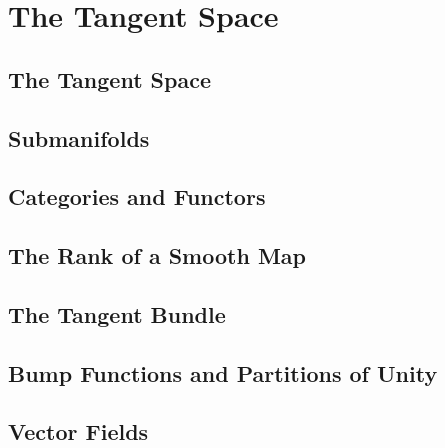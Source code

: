 \chapter{The Tangent Space}

\section{The Tangent Space}

\section{Submanifolds}

\section{Categories and Functors}

\section{The Rank of a Smooth Map}

\section{The Tangent Bundle}

\section{Bump Functions and Partitions of Unity}

\section{Vector Fields}
